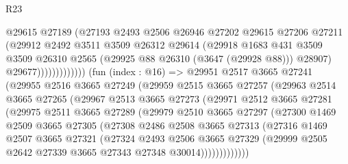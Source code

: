 \begin{lexlean}{R23}
\begin{coremodule}
                              @29615
                              @27189
                              (@27193
                                @2493
                                @2506
                                @26946
                                @27202
                                @29615
                                @27206
                                @27211
                                (@29912
                                  @2492
                                  @3511
                                  @3509
                                  @26312
                                  @29614
                                  (@29918
                                    @1683
                                    @431
                                    @3509
                                    @3509
                                    @26310
                                    @2565
                                    (@29925 @88 @26310 (@3647 (@29928 @88)))
                                    @28907)
                                  @29677)))))))))))))
        (fun (index : @16) =>
        @29951
          @2517
          @3665
          @27241
          (@29955
            @2516
            @3665
            @27249
            (@29959
              @2515
              @3665
              @27257
              (@29963
                @2514
                @3665
                @27265
                (@29967
                  @2513
                  @3665
                  @27273
                  (@29971
                    @2512
                    @3665
                    @27281
                    (@29975
                      @2511
                      @3665
                      @27289
                      (@29979
                        @2510
                        @3665
                        @27297
                        (@27300
                          @1469
                          @2509
                          @3665
                          @27305
                          (@27308
                            @2486
                            @2508
                            @3665
                            @27313
                            (@27316
                              @1469
                              @2507
                              @3665
                              @27321
                              (@27324
                                @2493
                                @2506
                                @3665
                                @27329
                                (@29999 @2505 @2642 @27339 @3665 @27343 @27348 @30014)))))))))))))

\end{coremodule}
\end{lexlean}
